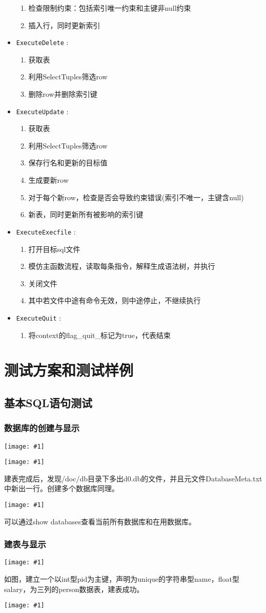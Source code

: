 \documentclass[12pt, a4paper]{article}
\def\c#1{\texttt{#1}}
\def\s#1{\section{#1}}
\def\ss#1{\subsection{#1}}
\def\sss#1{\subsubsection{#1}}
\def\p{\par}
\def\g#1{\begin{center}\texttt{[image: \#1]}\end{center}}
\def\gm#1{\begin{center}\texttt{[image: \#1]}\end{center}}
\begin{document}
\begin{itemize}
\begin{enumerate}
    \item 检查限制约束：包括索引唯一约束和主键非null约束
    \item 插入行，同时更新索引
  \end{enumerate}
  \item  \c{ExecuteDelete} : \begin{enumerate}
    \item 获取表
    \item 利用SelectTuples筛选row
    \item 删除row并删除索引键
  \end{enumerate}
  \item  \c{ExecuteUpdate} : \begin{enumerate}
    \item 获取表
    \item 利用SelectTuples筛选row
    \item 保存行名和更新的目标值
    \item 生成要新row
    \item 对于每个新row，检查是否会导致约束错误(索引不唯一，主键含null)
    \item 新表，同时更新所有被影响的索引键
  \end{enumerate}
  \item  \c{ExecuteExecfile} : \begin{enumerate}
    \item 打开目标sql文件
    \item 模仿主函数流程，读取每条指令，解释生成语法树，并执行
    \item 关闭文件
    \item 其中若文件中途有命令无效，则中途停止，不继续执行
  \end{enumerate}
  \item  \c{ExecuteQuit} : \begin{enumerate}
    \item 将context的flag\_quit\_标记为true，代表结束
  \end{enumerate}

\end{itemize}
\s{测试方案和测试样例}
\ss{基本SQL语句测试}
\sss{数据库的创建与显示}
\g{imgs/test_1.png}
\g{imgs/test_2.png}
\p 建表完成后，发现/doc/db目录下多出d0.db的文件，并且元文件DatabaseMeta.txt中新出一行。创建多个数据库同理。
\gm{imgs/test_3.png}
\p 可以通过show databases查看当前所有数据库和在用数据库。
\sss{建表与显示}
\g{imgs/test_4.png}
\p 如图，建立一个以int型pid为主键，声明为unique的字符串型name，float型salary，为三列的person数据表，建表成功。
\gm{imgs/test_5.png}
\end{document}

